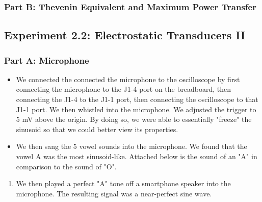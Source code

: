 \documentclass[10pt]{article}
\begin{document}
\subsubsection{Part B: Thevenin Equivalent and Maximum Power Transfer}
 

\subsection{Experiment 2.2: Electrostatic Transducers II}
\subsubsection{Part A: Microphone}
\begin{itemize}
	\item We connected the connected the microphone to the oscilloscope by first connecting the microphone to the J1-4 port on the breadboard, then connecting the J1-4 to the J1-1 port, then connecting the oscilloscope to that J1-1 port. We then whistled into the microphone. We adjusted the trigger to 5 mV above the origin. By doing so, we were able to essentially "freeze" the sinusoid so that we could better view its properties. 
	\item We then sang the 5 vowel sounds into the microphone. We found that the vowel A was the most sinusoid-like. Attached below is the sound of an "A" in comparison to the sound of "O". 
\end{itemize}

\begin{enumerate}
	\item  We then played a perfect "A" tone off a smartphone speaker into the microphone. The resulting signal was a near-perfect sine wave. 
\end{enumerate}
\end{document}
